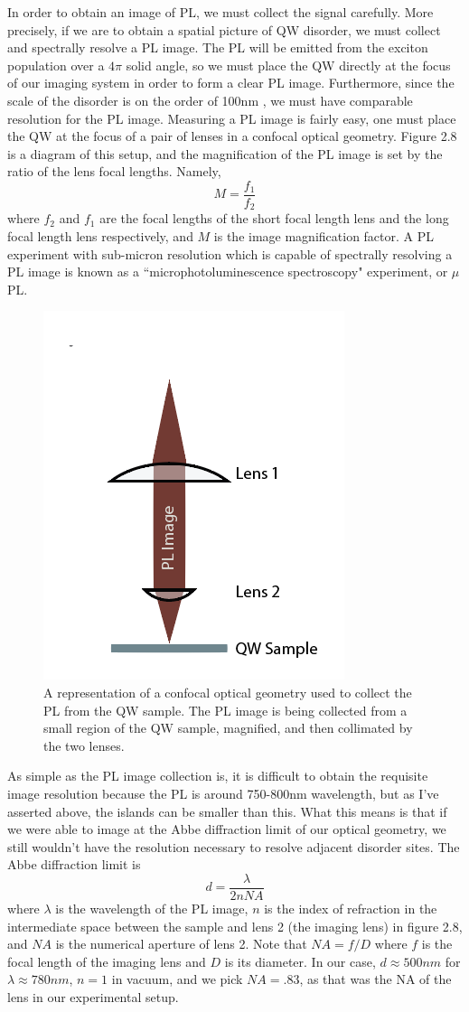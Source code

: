 \indent In order to obtain an image of PL, we must collect the signal carefully. More precisely, if we are to obtain a spatial picture of QW disorder, we must collect and spectrally resolve a PL image. The PL will be emitted from the exciton population over a $4 \pi$ solid angle, so we must place the QW directly at the focus of our imaging system in order to form a clear PL image. Furthermore, since the scale of the disorder is on the order of 100nm \cite{yoshitaterrace}, we must have comparable resolution for the PL image. Measuring a PL image is fairly easy, one must place the QW at the focus of a pair of lenses in a confocal optical geometry. Figure 2.8 is a diagram of this setup, and the magnification of the PL image is set by the ratio of the lens focal lengths. Namely,
\begin{equation}
M = \frac{f_1}{f_2}
\end{equation}
where $f_2$ and $f_1$ are the focal lengths of the short focal length lens and the long focal length lens respectively, and $M$ is the image magnification factor. A PL experiment with sub-micron resolution which is capable of spectrally resolving a PL image is known as a ``microphotoluminescence spectroscopy" experiment, or $\mu$PL.
\begin{figure}[h!]
\label{confocal}
\centering
\includegraphics[width = .3\textwidth]{confocal1.png}
\caption{\doublespacing A representation of a confocal optical geometry used to collect the PL from the QW sample. The PL image is being collected from a small region of the QW sample, magnified, and then collimated by the two lenses.}
\end{figure}

\indent As simple as the PL image collection is, it is difficult to obtain the requisite image resolution because the PL is around 750-800nm wavelength, but as I've asserted above, the islands can be smaller than this. What this means is that if we were able to image at the Abbe diffraction limit of our optical geometry, we still wouldn't have the resolution necessary to resolve adjacent disorder sites. The Abbe diffraction limit is
\begin{equation}
d = \frac{\lambda}{2nNA}
\end{equation}
where $\lambda$ is the wavelength of the PL image, $n$ is the index of refraction in the intermediate space between the sample and lens 2 (the imaging lens) in figure 2.8, and $NA$ is the numerical aperture of lens 2. Note that $NA = f / D$ where $f$ is the focal length of the imaging lens and $D$ is its diameter. In our case, $d \approx 500 nm$ for $\lambda \approx 780 nm$, $n = 1$ in vacuum, and we pick $NA = .83$, as that was the NA of the lens in our experimental setup. 

